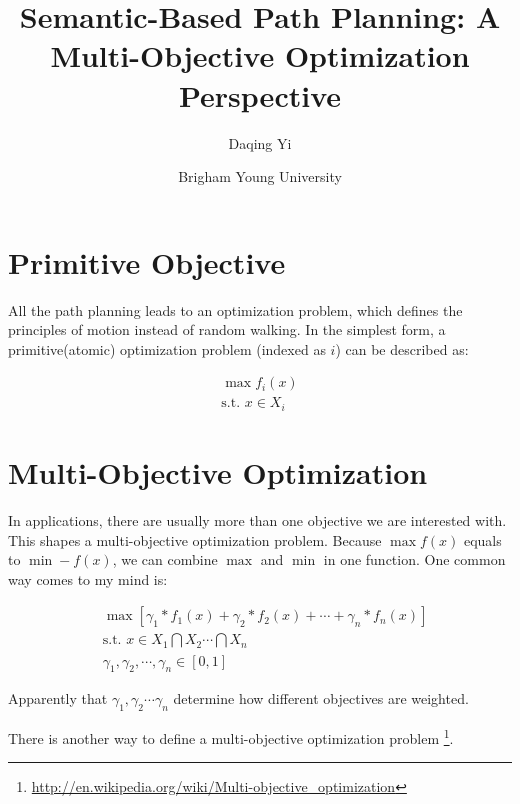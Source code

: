 \documentclass[12pt]{article}
\begin{document}
\title{\textsf{Semantic-Based Path Planning: A Multi-Objective Optimization Perspective}}
\author{\textsf{Daqing Yi}}
\date{\textsf{Brigham Young University}}

\maketitle

\section{Primitive Objective}

All the path planning leads to an optimization problem, which defines the principles of motion instead of random walking. In the simplest form, a primitive(atomic) optimization problem (indexed as $ i $) can be described as:

\begin{equation}
\label{eq:atomicObj}
\begin{aligned}
\max f_{i}(x) \\
\mbox{s.t. } x \in X_{i}
\end{aligned}
\end{equation}

\section{Multi-Objective Optimization}

In applications, there are usually more than one objective we are interested with. This shapes a multi-objective optimization problem. Because $ \max f(x) $ equals to $ \min -f(x) $, we can combine $ \max $ and $ \min $ in one function. One common way comes to my mind is:

\begin{equation}
\label{eq:severalObjs}
\begin{aligned}
& \max \left[ \gamma_{1} * f_{1}(x) + \gamma_{2} * f_{2}(x) + \cdots + \gamma_{n} * f_{n}(x) \right] \\
& \mbox{s.t. } x \in X_{1} \bigcap X_{2} \cdots \bigcap X_{n} \\
&\gamma_{1} , \gamma_{2} , \cdots , \gamma_{n} \in [0,1]
\end{aligned}
\end{equation}

Apparently that $ \gamma_{1}, \gamma_{2} \cdots \gamma_{n} $ determine how different objectives are weighted.

There is another way to define a multi-objective optimization problem \footnote{\url{http://en.wikipedia.org/wiki/Multi-objective_optimization}}. 
\end{document}
